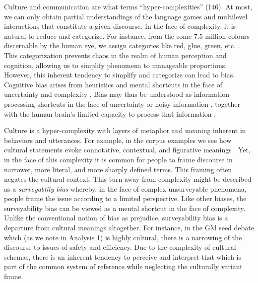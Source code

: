 Culture and communication are what \cite*{Sluga2011a} terms ``hyper-complexities'' (146). At most, we can only obtain partial understandings of the language games and multilevel interactions that constitute a given discourse. In the face of complexity, it is natural to reduce and categorize. For instance, from the some 7.5 million colours discernable by the human eye, we assign categories like red, glue, green, etc. \citep[889]{Hinner2017a}. This categorization prevents chaos in the realm of human perception and cognition, allowing us to simplify phenomena to manageable proportions. However, this inherent tendency to simplify and categorize can lead to bias. Cognitive bias arises from heuristics and mental shortcuts in the face of uncertainty and complexity \citep{Kahneman2002a}. Bias may thus be understood as information-processing shortcuts in the face of uncertainty \citep{Tversky1974a} or noisy information \citep{Hilbert2012a}, together with the human brain's limited capacity to process that information \citep{Simon1955a}.

Culture is a hyper-complexity with layers of metaphor and meaning inherent in behaviors and utterances. For example, in the corpus examples we see how cultural statements evoke connotative, contextual, and figurative meanings \citep{Klopf1998a}. Yet, in the face of this complexity it is common for people to frame discourse in narrower, more literal, and more sharply defined terms. This framing often negates the cultural context. This turn away from complexity might be described as a \textit{surveyablity bias} whereby, in the face of complex unsurveyable phenomena, people frame the issue according to a limited perspective. Like other biases, the surveyability bias can be viewed as a mental shortcut in the face of complexity. Unlike the conventional notion of bias as prejudice, surveyability bias is a departure from cultural meanings altogether. For instance, in the GM seed debate which (as we note in Analysis 1) is highly cultural, there is a narrowing of the discourse to issues of safety and efficiency. Due to the complexity of cultural schemas, there is an inherent tendency to perceive and interpret that which is part of the common system of reference while neglecting the culturally variant frame. 


